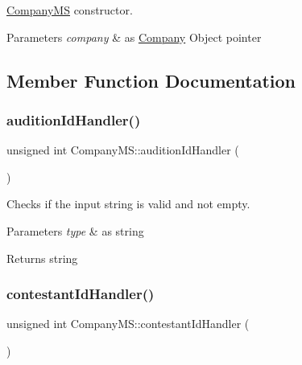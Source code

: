 \hyperlink{class_company_m_s}{Company\+MS} constructor. 


\begin{DoxyParams}{Parameters}
{\em company} & as \hyperlink{class_company}{Company} Object pointer \\
\hline
\end{DoxyParams}


\subsection{Member Function Documentation}
\mbox{\label{class_company_m_s_a3cb95a890e85cb5e4b733033ae34d56a}} 
\subsubsection{\texorpdfstring{audition\+Id\+Handler()}{auditionIdHandler()}}
{\footnotesize\ttfamily unsigned int Company\+M\+S\+::audition\+Id\+Handler (\begin{DoxyParamCaption}{ }\end{DoxyParamCaption})}



Checks if the input string is valid and not empty. 


\begin{DoxyParams}{Parameters}
{\em type} & as string \\
\hline
\end{DoxyParams}
\begin{DoxyReturn}{Returns}
string 
\end{DoxyReturn}
\mbox{\label{class_company_m_s_a084f27a52d2be6d54c82fccca6b1461f}} 
\subsubsection{\texorpdfstring{contestant\+Id\+Handler()}{contestantIdHandler()}}
{\footnotesize\ttfamily unsigned int Company\+M\+S\+::contestant\+Id\+Handler (\begin{DoxyParamCaption}{ }\end{DoxyParamCaption})}



